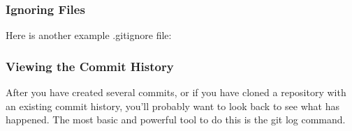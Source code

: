 \begin{frame}
  \frametitle{Ignoring Files}

  Here is another example .gitignore file:

  \vspace{2em}

  \gitignoreExample

\end{frame}

\begin{frame}
  \frametitle{Viewing the Commit History}

  After you have created several commits, or if you have cloned a repository with an existing commit history, you’ll probably want to look back to see what has happened. The most basic and powerful tool to do this is the git log command.
  \vspace{2em}

\end{frame}

